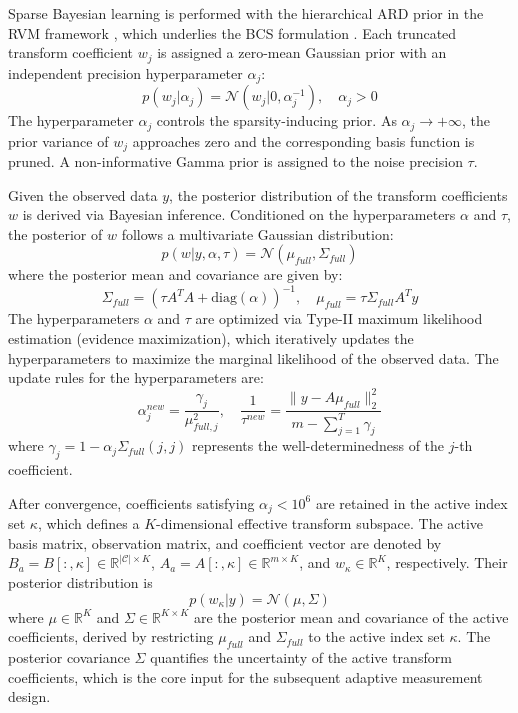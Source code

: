 \documentclass[lettersize,journal]{IEEEtran}
\begin{document}
Sparse Bayesian learning is performed with the hierarchical ARD prior in the RVM framework \cite{Tipping2001RVM}, which underlies the BCS formulation \cite{JiXueCarin2008BCS}. Each truncated transform coefficient $w_j$ is assigned a zero-mean Gaussian prior with an independent precision hyperparameter $\alpha_j$:
\begin{equation}
p(w_j | \alpha_j) = \mathcal{N}(w_j | 0, \alpha_j^{-1}), \quad \alpha_j > 0
\end{equation}
The hyperparameter $\alpha_j$ controls the sparsity-inducing prior. As $\alpha_j \to +\infty$, the prior variance of $w_j$ approaches zero and the corresponding basis function is pruned. A non-informative Gamma prior is assigned to the noise precision $\tau$.

Given the observed data $y$, the posterior distribution of the transform coefficients $w$ is derived via Bayesian inference. Conditioned on the hyperparameters $\alpha$ and $\tau$, the posterior of $w$ follows a multivariate Gaussian distribution:
\begin{equation}
p(w | y, \alpha, \tau) = \mathcal{N}(\mu_{full}, \Sigma_{full})
\end{equation}
where the posterior mean and covariance are given by:
\begin{equation}
\Sigma_{full} = \left( \tau A^T A + \text{diag}(\alpha) \right)^{-1}, \quad \mu_{full} = \tau \Sigma_{full} A^T y
\end{equation}
The hyperparameters $\alpha$ and $\tau$ are optimized via Type-II maximum likelihood estimation (evidence maximization), which iteratively updates the hyperparameters to maximize the marginal likelihood of the observed data. The update rules for the hyperparameters are:
\begin{equation}
\alpha_j^{new} = \frac{\gamma_j}{\mu_{full,j}^2}, \quad \frac{1}{\tau^{new}} = \frac{\|y - A\mu_{full}\|_2^2}{m - \sum_{j=1}^T \gamma_j}
\end{equation}
where $\gamma_j = 1 - \alpha_j \Sigma_{full}(j,j)$ represents the well-determinedness of the $j$-th coefficient.

After convergence, coefficients satisfying $\alpha_j < 10^6$ are retained in the active index set $\kappa$, which defines a $K$-dimensional effective transform subspace. The active basis matrix, observation matrix, and coefficient vector are denoted by $B_a = B[:, \kappa] \in \mathbb{R}^{|\mathcal{C}| \times K}$, $A_a = A[:, \kappa] \in \mathbb{R}^{m \times K}$, and $w_\kappa \in \mathbb{R}^K$, respectively. Their posterior distribution is
\begin{equation}
p(w_\kappa | y) = \mathcal{N}(\mu, \Sigma)
\end{equation}
where $\mu \in \mathbb{R}^K$ and $\Sigma \in \mathbb{R}^{K \times K}$ are the posterior mean and covariance of the active coefficients, derived by restricting $\mu_{full}$ and $\Sigma_{full}$ to the active index set $\kappa$. The posterior covariance $\Sigma$ quantifies the uncertainty of the active transform coefficients, which is the core input for the subsequent adaptive measurement design.
\end{document}
